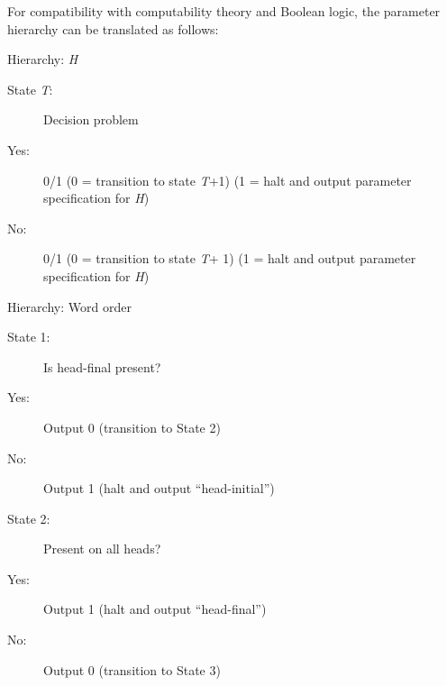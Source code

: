 \documentclass[output=paper]{langsci/langscibook}
\begin{document}
\begin{figure}


\end{figure}

For compatibility with computability theory and Boolean logic, the parameter
hierarchy can be translated as follows:

\ea Hierarchy: \emph{H}
\begin{description}
\item[State \emph{T}:] Decision problem
\item[Yes:] 0/1 (0 = transition to state \emph{T}+1) (1 = halt and output parameter specification for \emph{H})
\item[No:] 0/1 (0 = transition to state \emph{T}+ 1) (1 = halt and output parameter specification for \emph{H})
\end{description}
\pagebreak\ex
Hierarchy: Word order
 \begin{description}
\item[State 1:] Is head-final present?
\item[Yes:] Output 0 (transition to State 2)
\item[No:] Output 1 (halt and output “head-initial”)
 \end{description}

 \begin{description}
\item[State 2:] Present on all heads?
\item[Yes:] Output 1 (halt and output “head-final”)
\item[No:] Output 0 (transition to State 3)
 \end{description}
\end{document}
